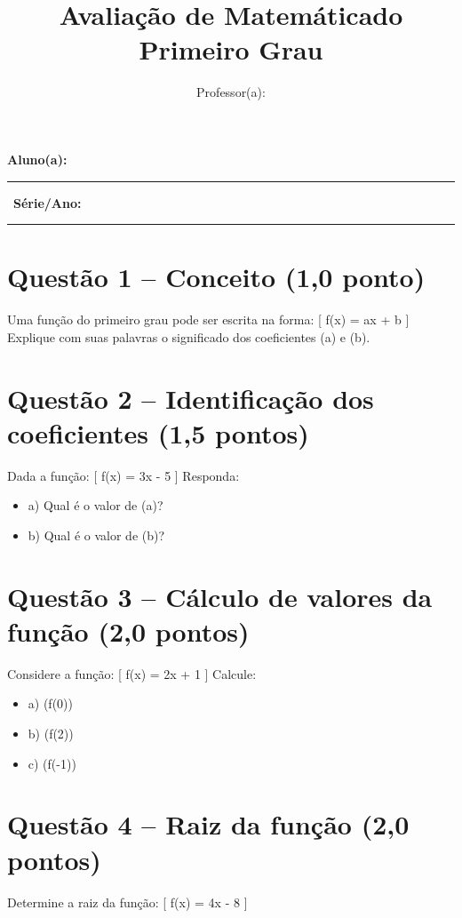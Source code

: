 \documentclass[12pt]{article}
\title{Avaliação de Matemática\Função do Primeiro Grau}
\author{Professor(a): \rule{8cm}{0.4pt}}
\date{Data: \rule{3cm}{0.4pt}}
\begin{document}
\maketitle

\vspace{0.5cm}

\textbf{Aluno(a):} \rule{10cm}{0.4pt} \
\textbf{Série/Ano:} \rule{4cm}{0.4pt}

\vspace{0.8cm}

\section*{Questão 1 – Conceito (1,0 ponto)}
Uma função do primeiro grau pode ser escrita na forma:
[
f(x) = ax + b
]
Explique com suas palavras o significado dos coeficientes (a) e (b).

\vspace{2cm}

\section*{Questão 2 – Identificação dos coeficientes (1,5 pontos)}
Dada a função:
[
f(x) = 3x - 5
]
Responda:

\begin{itemize}
\item a) Qual é o valor de (a)?
\item b) Qual é o valor de (b)?
\end{itemize}

\vspace{1.5cm}

\section*{Questão 3 – Cálculo de valores da função (2,0 pontos)}
Considere a função:
[
f(x) = 2x + 1
]
Calcule:

\begin{itemize}
\item a) (f(0))
\item b) (f(2))
\item c) (f(-1))
\end{itemize}

\vspace{1.5cm}

\section*{Questão 4 – Raiz da função (2,0 pontos)}
Determine a raiz da função:
[
f(x) = 4x - 8
]
\end{document}

